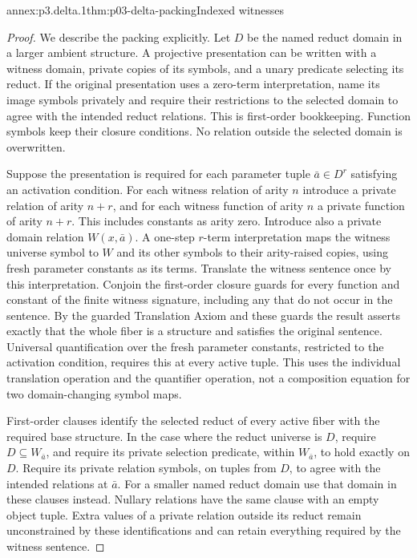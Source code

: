 \begin{annexitem}{annex:p3.delta.1}{thm:p03-delta-packing}{Indexed witnesses}
\begin{proof}
We describe the packing explicitly. Let \(D\) be the named reduct
domain in a larger ambient structure. A projective presentation can be
written with a witness domain, private copies of its symbols, and a
unary predicate selecting its reduct. If the original presentation uses
a zero-term interpretation, name its image symbols privately and
require their restrictions to the selected domain to agree with the
intended reduct relations. This is first-order bookkeeping. Function
symbols keep their closure conditions. No relation outside the selected
domain is overwritten.

Suppose the presentation is required for each parameter tuple
\(\bar a\in D^r\) satisfying an activation condition. For each
witness relation of arity \(n\) introduce a private relation of arity
\(n+r\), and for each witness function of arity \(n\) a private
function of arity \(n+r\). This includes constants as arity zero.
Introduce also a private domain relation \(W(x,\bar a)\). A one-step
\(r\)-term interpretation maps the witness universe symbol to \(W\)
and its other symbols to their arity-raised copies, using fresh
parameter constants as its terms. Translate the witness sentence once
by this interpretation. Conjoin the first-order closure guards for
every function and constant of the finite witness signature, including
any that do not occur in the sentence. By the guarded Translation Axiom
and these guards the result asserts exactly that the whole fiber is a
structure and satisfies the original sentence. Universal quantification over the fresh parameter
constants, restricted to the activation condition, requires this at
every active tuple. This uses the individual translation operation and
the quantifier operation, not a composition equation for two
domain-changing symbol maps.

First-order clauses identify the selected reduct of every active fiber
with the required base structure. In the case where the reduct universe
is \(D\), require \(D\subseteq W_{\bar a}\), and require its private
selection predicate, within \(W_{\bar a}\), to hold exactly on \(D\).
Require its private relation symbols, on tuples from \(D\), to agree
with the intended relations at \(\bar a\). For a smaller named reduct
domain use that domain in these clauses instead. Nullary relations
have the same clause with an empty object tuple. Extra values of a
private relation outside its reduct remain unconstrained by these
identifications and can retain everything required by the witness
sentence.


\end{proof}
\end{annexitem}
